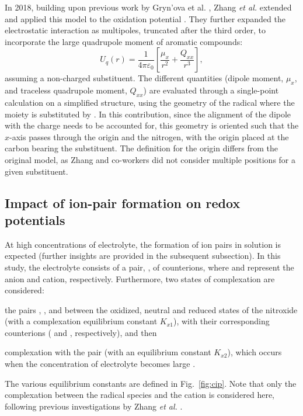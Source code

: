 \documentclass[review]{elsarticle}
\begin{document}
In 2018, building upon previous work by Gryn'ova et al. \cite{grynovaOriginScopeLongRange2013,grynovaSwitchingRadicalStability2013}, Zhang \textit{et al.} extended and applied this model to the oxidation potential \cite{zhangEffectHeteroatomFunctionality2018}. They further expanded the electrostatic interaction as multipoles, truncated after the third order, to incorporate the large quadrupole moment of aromatic compounds:
\begin{equation}
	U_q(r) =\frac{1}{4\pi\varepsilon_0} \left[\frac{\mu_x}{r^2} + \frac{Q_{xx}}{r^3}\right], \label{eq:Er}
\end{equation}
assuming a non-charged substituent. The different quantities (dipole moment, $\mu_x$, and traceless quadrupole moment, $Q_{xx}$) are evaluated through a single-point calculation on a simplified structure, using the geometry of the radical where the  moiety is substituted by . In this contribution, since the alignment of the dipole with the charge needs to be accounted for, this geometry is oriented such that the $x$-axis passes through the origin and the nitrogen, with the origin placed at the carbon bearing the substituent. The definition for the origin differs from the original model, as Zhang and co-workers did not consider multiple positions for a given substituent.


\subsection{Impact of ion-pair formation on redox potentials}

At high concentrations of electrolyte, the formation of ion pairs in solution is expected (further insights are provided in the subsequent subsection). In this study, the electrolyte consists of a pair, , of counterions, where  and  represent the anion and cation, respectively. Furthermore, two states of complexation are considered: \begin{inparaenum}[(i)]
	\item the pairs , , and  between the oxidized, neutral and reduced states of the nitroxide  (with a complexation equilibrium constant $K_{x1}$), with their corresponding counterions ( and , respectively), and then
	\item complexation with the  pair (with an equilibrium constant $K_{x2}$), which occurs when the concentration of electrolyte becomes large \cite{wylieImprovedPerformanceAllOrganic2019a}.
\end{inparaenum}
The various equilibrium constants are defined in Fig.~\ref{fig:cip}. Note that only the complexation between the radical species and the cation is considered here, following previous investigations by Zhang \textit{et al.} \cite{zhangInteractionsImidazoliumBasedIonic2016}.
\end{document}
